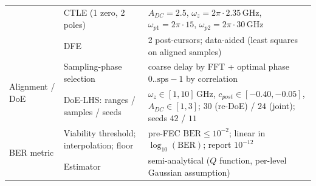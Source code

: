 \begin{table}[!t]
\begin{tabular}{p{} p{} p{}}
 & CTLE (1 zero, 2 poles) & $A_{DC}=2.5$, $\omega_z=2\pi\!\cdot\!2.35\,\mathrm{GHz}$, $\omega_{p1}=2\pi\!\cdot\!15$, $\omega_{p2}=2\pi\!\cdot\!30\,\mathrm{GHz}$ \\
 & DFE & 2 post-cursors; data-aided (least squares on aligned samples) \\
\hline
\multirow{2}{*}{Alignment / DoE}
 & Sampling-phase selection & coarse delay by FFT + optimal phase $0..\mathrm{sps}{-}1$ by correlation \\
 & DoE-LHS: ranges / samples / seeds & $\omega_z\!\in\![1,10]\,\mathrm{GHz}$, $c_{post}\!\in\![-0.40,-0.05]$, $A_{DC}\!\in\![1,3]$; $30$ (re-DoE) / $24$ (joint); seeds $42$ / $11$ \\
\hline
\multirow{2}{*}{BER metric}
 & Viability threshold; interpolation; floor & pre-FEC $\mathrm{BER}\le10^{-2}$; linear in $\log_{10}(\mathrm{BER})$; report $10^{-12}$ \\
 & Estimator & semi-analytical ($Q$ function, per-level Gaussian assumption) \\
\hline
\end{tabular}
\end{table}
